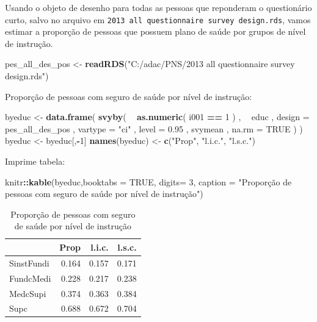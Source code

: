 \documentclass[]{book}
\newenvironment{Shaded}{\begin{snugshade}}{\end{snugshade}}
\newcommand{\KeywordTok}[1]{\textcolor[rgb]{0.13,0.29,0.53}{\textbf{#1}}}
\newcommand{\DataTypeTok}[1]{\textcolor[rgb]{0.13,0.29,0.53}{#1}}
\newcommand{\DecValTok}[1]{\textcolor[rgb]{0.00,0.00,0.81}{#1}}
\newcommand{\FloatTok}[1]{\textcolor[rgb]{0.00,0.00,0.81}{#1}}
\newcommand{\StringTok}[1]{\textcolor[rgb]{0.31,0.60,0.02}{#1}}
\newcommand{\OtherTok}[1]{\textcolor[rgb]{0.56,0.35,0.01}{#1}}
\newcommand{\OperatorTok}[1]{\textcolor[rgb]{0.81,0.36,0.00}{\textbf{#1}}}
\newcommand{\NormalTok}[1]{#1}
\theoremstyle{definition}
\theoremstyle{definition}
\theoremstyle{definition}
\theoremstyle{remark}
\begin{document}
Usando o objeto de desenho para todas as pessoas que reponderam o
questionário curto, salvo no arquivo em
\texttt{2013\ all\ questionnaire\ survey\ design.rds}, vamos estimar a
proporção de pessoas que possuem plano de saúde por grupos de nível de
instrução.

\begin{Shaded}
\begin{Highlighting}[]
\NormalTok{pes_all_des_pos <-}\StringTok{ }\KeywordTok{readRDS}\NormalTok{(}\StringTok{"C:/adac/PNS/2013 all questionnaire survey design.rds"}\NormalTok{)}
\end{Highlighting}
\end{Shaded}

Proporção de pessoas com seguro de saúde por nível de instrução:

\begin{Shaded}
\begin{Highlighting}[]
\NormalTok{byeduc <-}\StringTok{ }\KeywordTok{data.frame}\NormalTok{( }\KeywordTok{svyby}\NormalTok{( }\OperatorTok{~}\StringTok{ }\KeywordTok{as.numeric}\NormalTok{( i001 }\OperatorTok{==}\StringTok{ }\DecValTok{1}\NormalTok{ ) , }\OperatorTok{~}\StringTok{ }\NormalTok{educ ,}
\DataTypeTok{design =}\NormalTok{ pes_all_des_pos , }\DataTypeTok{vartype =} \StringTok{"ci"}\NormalTok{ ,  }\DataTypeTok{level =} \FloatTok{0.95}\NormalTok{ ,}
\NormalTok{svymean , }\DataTypeTok{na.rm =} \OtherTok{TRUE}\NormalTok{ ) )}
\NormalTok{byeduc <-}\StringTok{ }\NormalTok{byeduc[,}\OperatorTok{-}\DecValTok{1}\NormalTok{]}
\KeywordTok{names}\NormalTok{(byeduc) <-}\StringTok{ }\KeywordTok{c}\NormalTok{(}\StringTok{"Prop"}\NormalTok{, }\StringTok{"l.i.c."}\NormalTok{, }\StringTok{"l.s.c."}\NormalTok{)}
\end{Highlighting}
\end{Shaded}

Imprime tabela:

\begin{Shaded}
\begin{Highlighting}[]
\NormalTok{knitr}\OperatorTok{::}\KeywordTok{kable}\NormalTok{(byeduc,}\DataTypeTok{booktabs =} \OtherTok{TRUE}\NormalTok{,  }
\DataTypeTok{digits=} \DecValTok{3}\NormalTok{, }\DataTypeTok{caption =} \StringTok{"Proporção de pessoas com seguro de saúde por nível de instrução"}\NormalTok{)}
\end{Highlighting}
\end{Shaded}

\begin{table}

\caption{\label{tab:unnamed-chunk-55}Proporção de pessoas com seguro de saúde por nível de instrução}
\centering
\begin{tabular}[t]{lrrr}
\toprule
  & Prop & l.i.c. & l.s.c.\\
\midrule
SinstFundi & 0.164 & 0.157 & 0.171\\
FundcMedi & 0.228 & 0.217 & 0.238\\
MedcSupi & 0.374 & 0.363 & 0.384\\
Supc & 0.688 & 0.672 & 0.704\\
\bottomrule
\end{tabular}
\end{table}
\end{document}

